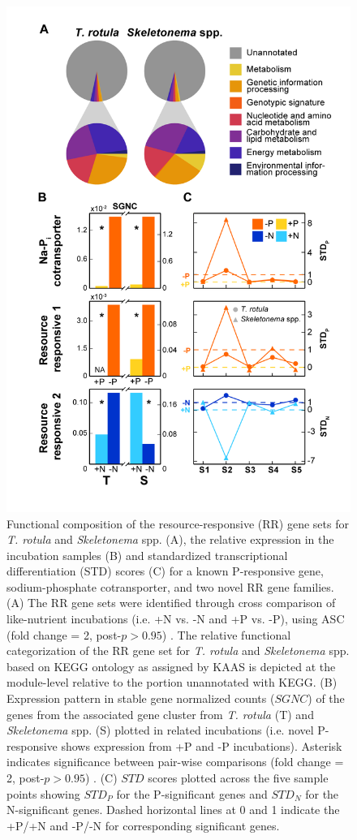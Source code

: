 

\begin{figure}[p!]
  \centering
    \includegraphics[width=.65\textwidth]{Images/C3_Figure4_BarLinePlots.png}
    \caption[Functional composition of resource-responsive gene set]{Functional composition of the resource-responsive (RR) gene sets for \textit{T. rotula} and \textit{Skeletonema} spp. (A), the relative expression in the incubation samples (B) and standardized transcriptional differentiation (STD) scores (C) for a known P-responsive gene, sodium-phosphate cotransporter, and two novel RR gene families. (A) The RR gene sets were identified through cross comparison of like-nutrient incubations (i.e. +N vs. -N and +P vs. -P), using ASC (fold change = 2, post-$p > 0.95$) \citep{Wu2010}. The relative functional categorization of the RR gene set for \textit{T. rotula} and \textit{Skeletonema} spp. based on KEGG ontology as assigned by KAAS is depicted at the module-level relative to the portion unannotated with KEGG. (B) Expression pattern in stable gene normalized counts ($SGNC$) of the genes from the associated gene cluster from \textit{T. rotula} (T) and \textit{Skeletonema} spp. (S) plotted in related incubations (i.e. novel P-responsive shows expression from +P and -P incubations). Asterisk indicates significance between pair-wise comparisons (fold change = 2, post-$p > 0.95$) \citep{Wu2010}. (C) $STD$ scores plotted across the five sample points showing $STD_P$ for the P-significant genes and $STD_N$ for the N-significant genes. Dashed horizontal lines at 0 and 1 indicate the +P/+N and -P/-N for corresponding significant genes.} 
  \label{fig:c3f4}
\end{figure}

